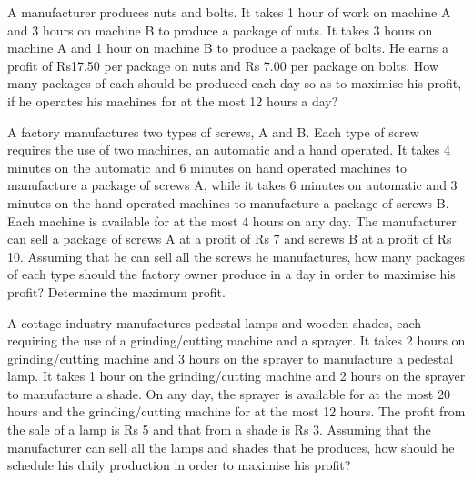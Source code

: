 \item A manufacturer produces nuts and bolts. It takes 1 hour of work on machine A
and 3 hours on machine B to produce a package of nuts. It takes 3 hours on
machine A and 1 hour on machine B to produce a package of bolts. He earns a
profit of Rs17.50 per package on nuts and Rs 7.00 per package on bolts. How
many packages of each should be produced each day so as to maximise his
profit, if he operates his machines for at the most 12 hours a day?\\
\solution


\item A factory manufactures two types of screws, A and B. Each type of screw
requires the use of two machines, an automatic and a hand operated. It takes
4 minutes on the automatic and 6 minutes on hand operated machines to
manufacture a package of screws A, while it takes 6 minutes on automatic and
3 minutes on the hand operated machines to manufacture a package of screws
B. Each machine is available for at the most 4 hours on any day. The manufacturer
can sell a package of screws A at a profit of Rs 7 and screws B at a profit of
Rs 10. Assuming that he can sell all the screws he manufactures, how many
packages of each type should the factory owner produce in a day in order to
maximise his profit? Determine the maximum profit.\\
\solution


\item A cottage industry manufactures pedestal lamps and wooden shades, each
requiring the use of a grinding/cutting machine and a sprayer. It takes 2 hours on
grinding/cutting machine and 3 hours on the sprayer to manufacture a pedestal
lamp. It takes 1 hour on the grinding/cutting machine and 2 hours on the sprayer
to manufacture a shade. On any day, the sprayer is available for at the most 20
hours and the grinding/cutting machine for at the most 12 hours. The profit from
the sale of a lamp is Rs 5 and that from a shade is Rs 3. Assuming that the
manufacturer can sell all the lamps and shades that he produces, how should he
schedule his daily production in order to maximise his profit?\\
\solution


